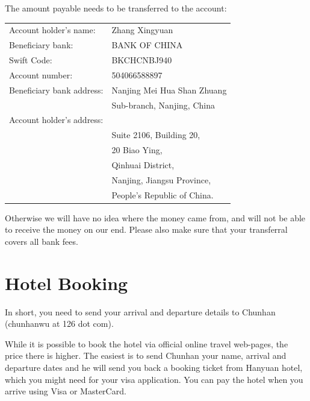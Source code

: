 \documentclass[11pt]{report}
\def\cwemail{chunhanwu at 126 dot com}
\begin{document}
\noindent The amount payable needs to be
transferred to the account:

\begin{center}
\begin{tabular}{ll}
Account holder's name:&  Zhang Xingyuan\medskip\\

Beneficiary bank:& BANK OF CHINA\medskip\\

Swift Code:& BKCHCNBJ940\medskip\\

Account number:& 504066588897\medskip\\

Beneficiary bank address:&   Nanjing Mei Hua Shan Zhuang\\ 
                         &    Sub-branch, Nanjing, China\medskip\\

Account holder's address:& \\
  & Suite 2106, Building 20,\\
  & 20 Biao Ying,\\ 
  & Qinhuai District,\\ 
  & Nanjing, Jiangsu Province,\\
  & People's Republic of China.\\
\end{tabular}
\end{center}

 Otherwise we will have no idea 
where the money came from, and will not be able to receive
the money on our end. Please also make sure that your transferral
covers all bank fees.\bigskip


\section{Hotel Booking}


In short, you need to send your arrival and departure 
details to Chunhan 
(\cwemail).\bigskip

\noindent While it is possible to book the hotel via official
online travel web-pages, the price there is higher. The
easiest is to send Chunhan your name, arrival and departure
dates and he will send you back a booking ticket from Hanyuan
hotel, which you might need for your visa application. 
You can pay the hotel when you arrive using Visa or
MasterCard.
\end{document}
